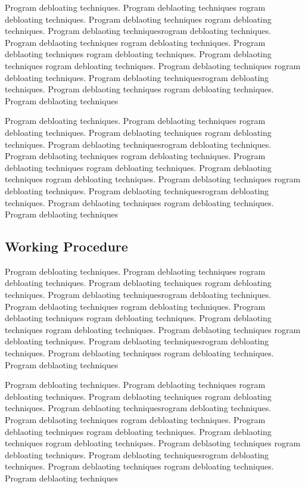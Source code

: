 \documentclass{relatorio}
\begin{document}
Program debloating techniques. Program deblaoting techniques rogram debloating techniques. Program deblaoting techniques
rogram debloating techniques. Program deblaoting techniquesrogram debloating techniques. Program deblaoting techniques
rogram debloating techniques. Program deblaoting techniques rogram debloating techniques. Program deblaoting techniques
rogram debloating techniques. Program deblaoting techniques 
rogram debloating techniques. Program deblaoting techniquesrogram debloating techniques. Program deblaoting techniques
rogram debloating techniques. Program deblaoting techniques

Program debloating techniques. Program deblaoting techniques rogram debloating techniques. Program deblaoting techniques
rogram debloating techniques. Program deblaoting techniquesrogram debloating techniques. Program deblaoting techniques
rogram debloating techniques. Program deblaoting techniques rogram debloating techniques. Program deblaoting techniques
rogram debloating techniques. Program deblaoting techniques 
rogram debloating techniques. Program deblaoting techniquesrogram debloating techniques. Program deblaoting techniques
rogram debloating techniques. Program deblaoting techniques

\subsection{Working Procedure}%
\label{Tools}

Program debloating techniques. Program deblaoting techniques rogram debloating techniques. Program deblaoting techniques
rogram debloating techniques. Program deblaoting techniquesrogram debloating techniques. Program deblaoting techniques
rogram debloating techniques. Program deblaoting techniques rogram debloating techniques. Program deblaoting techniques
rogram debloating techniques. Program deblaoting techniques 
rogram debloating techniques. Program deblaoting techniquesrogram debloating techniques. Program deblaoting techniques
rogram debloating techniques. Program deblaoting techniques

Program debloating techniques. Program deblaoting techniques rogram debloating techniques. Program deblaoting techniques
rogram debloating techniques. Program deblaoting techniquesrogram debloating techniques. Program deblaoting techniques
rogram debloating techniques. Program deblaoting techniques rogram debloating techniques. Program deblaoting techniques
rogram debloating techniques. Program deblaoting techniques 
rogram debloating techniques. Program deblaoting techniquesrogram debloating techniques. Program deblaoting techniques
rogram debloating techniques. Program deblaoting techniques
\end{document}
